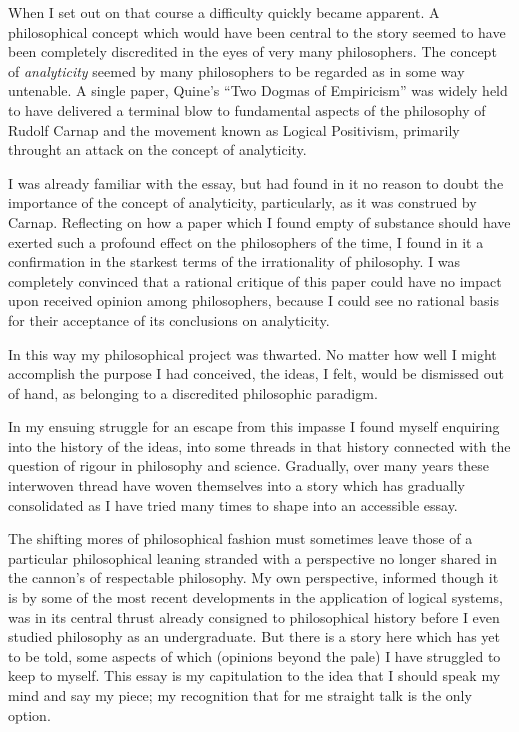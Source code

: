 When I set out on that course a difficulty quickly became apparent.
A philosophical concept which would have been central to the story seemed to have been completely discredited in the eyes of very many philosophers.
The concept of {\it analyticity} seemed by many philosophers to be regarded as in some way untenable.
A single paper, Quine's ``Two Dogmas of Empiricism'' was widely held to have delivered a terminal blow to fundamental aspects of the philosophy of Rudolf Carnap and the movement known as Logical Positivism, primarily throught an attack on the concept of analyticity.

I was already familiar with the essay, but had found in it no reason to doubt the importance of the concept of analyticity, particularly, as it was construed by Carnap.
Reflecting on how a paper which I found empty of substance should have exerted such a profound effect on the philosophers of the time, I found in it a confirmation in the starkest terms of the irrationality of philosophy.
I was completely convinced that a rational critique of this paper could have no impact upon received opinion among philosophers, because I could see no rational basis for their acceptance of its conclusions on analyticity.

In this way my philosophical project was thwarted.
No matter how well I might accomplish the purpose I had conceived, the ideas, I felt, would be dismissed out of hand, as belonging to a discredited philosophic paradigm.

In my ensuing struggle for an escape from this impasse I found myself enquiring into the history of the ideas, into some threads in that history connected with the question of rigour in philosophy and science.
Gradually, over many years these interwoven thread have woven themselves into a story which has gradually consolidated as I have tried many times to shape into an accessible essay.  

The shifting mores of philosophical fashion must sometimes leave those of a particular philosophical leaning stranded with a perspective no longer shared in the cannon's of respectable philosophy.
My own perspective, informed though it is by some of the most recent developments in the application of logical systems, was in its central thrust already consigned to philosophical history before I even studied philosophy as an undergraduate.
But there is a story here which has yet to be told, some aspects of which (opinions beyond the pale) I have struggled to keep to myself.
This essay is my capitulation to the idea that I should speak my mind and say my piece; my recognition that for me straight talk is the only option.

